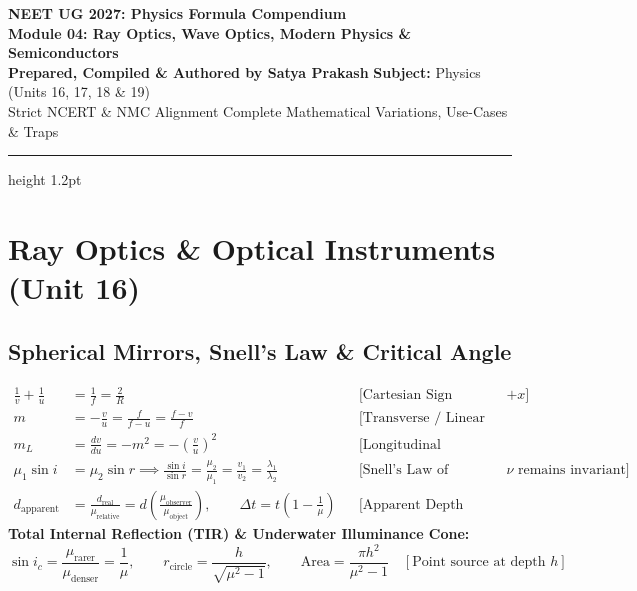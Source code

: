 \documentclass[11pt,a4paper]{article}
\begin{document}
\begin{center}
  {\huge\bfseries\color{primarydark} NEET UG 2027: Physics Formula Compendium}\\[6pt]
  {\Large\bfseries\color{accentblue} Module 04: Ray Optics, Wave Optics, Modern Physics \& Semiconductors}\\[8pt]
  {\normalsize\textbf{Prepared, Compiled \& Authored by Satya Prakash} \quad\textbar\quad \textbf{Subject:} Physics (Units 16, 17, 18 \& 19)}\\[4pt]
  {\footnotesize\color{gray} Strict NCERT \& NMC Alignment \quad\textbar\quad Complete Mathematical Variations, Use-Cases \& Traps}
\end{center}
\vspace{-2pt}
\hrule height 1.2pt
\vspace{8pt}

\section{Ray Optics \& Optical Instruments (Unit 16)}

\subsection{Spherical Mirrors, Snell's Law \& Critical Angle}

\begin{formulabox}
\begin{align}
  \frac{1}{v} + \frac{1}{u} &= \frac{1}{f} = \frac{2}{R} && \text{[Cartesian Sign Convention: Pole is origin; light direction is $+x$]} \\
  m &= -\frac{v}{u} = \frac{f}{f - u} = \frac{f - v}{f} && \text{[Transverse / Linear Magnification]} \\
  m_L &= \frac{dv}{du} = -m^2 = -\left(\frac{v}{u}\right)^2 && \text{[Longitudinal Magnification for small object along axis]} \\
  \mu_1 \sin i &= \mu_2 \sin r \implies \frac{\sin i}{\sin r} = \frac{\mu_2}{\mu_1} = \frac{v_1}{v_2} = \frac{\lambda_1}{\lambda_2} && \text{[Snell's Law of Refraction; Frequency $\nu$ remains invariant]} \\
  d_{\text{apparent}} &= \frac{d_{\text{real}}}{\mu_{\text{relative}}} = d\left(\frac{\mu_{\text{observer}}}{\mu_{\text{object}}}\right), \qquad \Delta t = t\left(1 - \frac{1}{\mu}\right) && \text{[Apparent Depth \& Normal Shift through slab]}
\end{align}
\textbf{Total Internal Reflection (TIR) \& Underwater Illuminance Cone:}
\begin{equation}
  \sin i_c = \frac{\mu_{\text{rarer}}}{\mu_{\text{denser}}} = \frac{1}{\mu}, \qquad r_{\text{circle}} = \frac{h}{\sqrt{\mu^2 - 1}}, \qquad \text{Area} = \frac{\pi h^2}{\mu^2 - 1} \quad [\text{Point source at depth } h]
\end{equation}
\end{formulabox}
\end{document}
